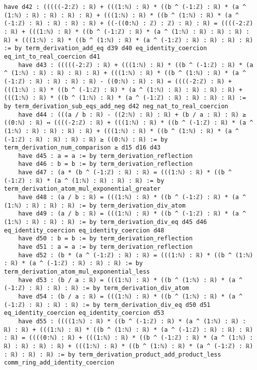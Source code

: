 \documentclass{article}
\begin{document}
\begin{tcolorbox}[colback=white!10, width=\linewidth]
\begin{lstlisting}[language=Lean4]
    have d42 : (((((-2:ℤ) : ℝ) + (((1:ℕ) : ℝ) * ((b ^ (-1:ℤ) : ℝ) * (a ^ (1:ℕ) : ℝ) : ℝ) : ℝ) : ℝ) + (((1:ℕ) : ℝ) * ((b ^ (1:ℕ) : ℝ) * (a ^ (-1:ℤ) : ℝ) : ℝ) : ℝ) : ℝ) + ((-((0:ℕ) : ℤ) : ℤ) : ℝ) : ℝ) = ((((-2:ℤ) : ℝ) + (((1:ℕ) : ℝ) * ((b ^ (-1:ℤ) : ℝ) * (a ^ (1:ℕ) : ℝ) : ℝ) : ℝ) : ℝ) + (((1:ℕ) : ℝ) * ((b ^ (1:ℕ) : ℝ) * (a ^ (-1:ℤ) : ℝ) : ℝ) : ℝ) : ℝ) := by term_derivation_add_eq d39 d40 eq_identity_coercion eq_int_to_real_coercion d41
    have d43 : (((((-2:ℤ) : ℝ) + (((1:ℕ) : ℝ) * ((b ^ (-1:ℤ) : ℝ) * (a ^ (1:ℕ) : ℝ) : ℝ) : ℝ) : ℝ) + (((1:ℕ) : ℝ) * ((b ^ (1:ℕ) : ℝ) * (a ^ (-1:ℤ) : ℝ) : ℝ) : ℝ) : ℝ) - ((0:ℕ) : ℝ) : ℝ) = ((((-2:ℤ) : ℝ) + (((1:ℕ) : ℝ) * ((b ^ (-1:ℤ) : ℝ) * (a ^ (1:ℕ) : ℝ) : ℝ) : ℝ) : ℝ) + (((1:ℕ) : ℝ) * ((b ^ (1:ℕ) : ℝ) * (a ^ (-1:ℤ) : ℝ) : ℝ) : ℝ) : ℝ) := by term_derivation_sub_eqs_add_neg d42 neg_nat_to_real_coercion
    have d44 : (((a / b : ℝ) - ((2:ℕ) : ℝ) : ℝ) + (b / a : ℝ) : ℝ) ≥ ((0:ℕ) : ℝ) ↔ ((((-2:ℤ) : ℝ) + (((1:ℕ) : ℝ) * ((b ^ (-1:ℤ) : ℝ) * (a ^ (1:ℕ) : ℝ) : ℝ) : ℝ) : ℝ) + (((1:ℕ) : ℝ) * ((b ^ (1:ℕ) : ℝ) * (a ^ (-1:ℤ) : ℝ) : ℝ) : ℝ) : ℝ) ≥ ((0:ℕ) : ℝ) := by term_derivation_num_comparison ≥ d15 d16 d43
    have d45 : a = a := by term_derivation_reflection
    have d46 : b = b := by term_derivation_reflection
    have d47 : (a * (b ^ (-1:ℤ) : ℝ) : ℝ) = (((1:ℕ) : ℝ) * ((b ^ (-1:ℤ) : ℝ) * (a ^ (1:ℕ) : ℝ) : ℝ) : ℝ) := by term_derivation_atom_mul_exponential_greater
    have d48 : (a / b : ℝ) = (((1:ℕ) : ℝ) * ((b ^ (-1:ℤ) : ℝ) * (a ^ (1:ℕ) : ℝ) : ℝ) : ℝ) := by term_derivation_div_atom
    have d49 : (a / b : ℝ) = (((1:ℕ) : ℝ) * ((b ^ (-1:ℤ) : ℝ) * (a ^ (1:ℕ) : ℝ) : ℝ) : ℝ) := by term_derivation_div_eq d45 d46 eq_identity_coercion eq_identity_coercion d48
    have d50 : b = b := by term_derivation_reflection
    have d51 : a = a := by term_derivation_reflection
    have d52 : (b * (a ^ (-1:ℤ) : ℝ) : ℝ) = (((1:ℕ) : ℝ) * ((b ^ (1:ℕ) : ℝ) * (a ^ (-1:ℤ) : ℝ) : ℝ) : ℝ) := by term_derivation_atom_mul_exponential_less
    have d53 : (b / a : ℝ) = (((1:ℕ) : ℝ) * ((b ^ (1:ℕ) : ℝ) * (a ^ (-1:ℤ) : ℝ) : ℝ) : ℝ) := by term_derivation_div_atom
    have d54 : (b / a : ℝ) = (((1:ℕ) : ℝ) * ((b ^ (1:ℕ) : ℝ) * (a ^ (-1:ℤ) : ℝ) : ℝ) : ℝ) := by term_derivation_div_eq d50 d51 eq_identity_coercion eq_identity_coercion d53
    have d55 : ((((1:ℕ) : ℝ) * ((b ^ (-1:ℤ) : ℝ) * (a ^ (1:ℕ) : ℝ) : ℝ) : ℝ) + (((1:ℕ) : ℝ) * ((b ^ (1:ℕ) : ℝ) * (a ^ (-1:ℤ) : ℝ) : ℝ) : ℝ) : ℝ) = ((((0:ℕ) : ℝ) + (((1:ℕ) : ℝ) * ((b ^ (-1:ℤ) : ℝ) * (a ^ (1:ℕ) : ℝ) : ℝ) : ℝ) : ℝ) + (((1:ℕ) : ℝ) * ((b ^ (1:ℕ) : ℝ) * (a ^ (-1:ℤ) : ℝ) : ℝ) : ℝ) : ℝ) := by term_derivation_product_add_product_less comm_ring_add_identity_coercion

\end{lstlisting}
\end{tcolorbox}
\end{document}

